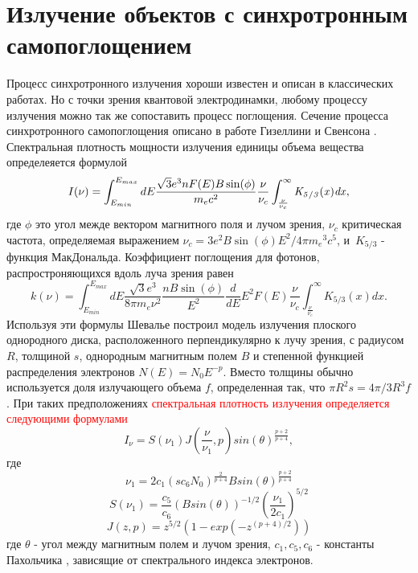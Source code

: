 \section{Излучение объектов с синхротронным самопоглощением}
Процесс синхротронного излучения хороши известен и описан в классических работах. Но с точки зрения квантовой электродинамки, любому процессу излучения можно так же сопоставить процесс поглощения. Сечение процесса синхротронного самопоглощения описано в работе Гизеллини и Свенсона \cite{Ghisellini1991}. Спектральная плотность мощности излучения единицы объема вещества определеяется формулой
\begin{equation} \label{emission}
I(\nu)=\int_{E_{min}}^{E_{max}} dE \frac {\sqrt {3}{e}^{3}n F(E) B \sin ( \phi)}{{m_e}{c}^{2}}
\frac{\nu}{\nu_c}\int_{\frac {\nu}{\nu_c}}^{\infty }\it K_{5/3}(x)dx,
\end{equation}
где $\phi$ это угол межде вектором магнитного поля и лучом зрения, $\displaystyle\nu_{c}$ критическая частота, определяемая выражением $\displaystyle\nu_{c} = 3 e^{2} B \sin(\phi) E^{2}/4\pi {m_{e}}^{3} c^{5}$, и~$K_{5/3}$ - функция МакДональда.
Коэффициент поглощения для фотонов, распростроняющихся вдоль луча зрения равен
\begin{equation}\label{absorption}
k(\nu)=\int_{E_{min}}^{E_{max}}dE\frac {\sqrt {3}{e}^{3}}{8\pi m_e \nu^2}\frac{n B\sin(\phi)}{E^2}
\frac{d}{dE} E^2 F(E)\frac {\nu}{ \nu_c}\int_{\frac {\nu}{ \nu_c}}^{\infty }K_{5/3}(x) dx.
\end{equation}
Используя эти формулы Шевалье \cite{Chevalier1998} построил модель излучения плоского однородного диска, расположенного перпендикулярно к лучу зрения, с радиусом $R$, толщиной $s$, однородным магнитным полем $B$ и степенной функцией распределения электронов $N(E) = N_0 E^{-p}$. Вместо толщины обычно используется доля излучающего объема $f$, определенная так, что $\pi R^2 s = 4 \pi /3 R^3 f$. При таких предположениях \textcolor{red}{спектральная плотность излучения определяется следующими формулами}
\begin{equation}
I_{\nu}=S(\nu_1)J(\frac{\nu}{\nu_1},p)
{sin(\theta)}^{\frac{p+2}{p+4}},
\end{equation}
где
\begin{equation}
\nu_1 = 2 c_1 {(s c_6 N_0)}^{\frac{2}{p+4}}{B sin(\theta)}^{\frac{p+2}{p+4}}
\end{equation}
\begin{equation}
S(\nu_1)=\frac{c_5}{c_6}{(B sin(\theta))}^{-1/2}{(\frac{\nu_1}{2 c_1})}^{5/2}
\end{equation}
\begin{equation}
J(z,p)=z^{5/2}(1-exp(-z^{(p+4)/2}))
\end{equation}
где $\theta$ - угол между магнитным полем и лучом зрения, $c_1, c_5, c_6$ - константы Пахольчика \cite{Pacholczyk}, зависящие от спектрального индекса электронов.


